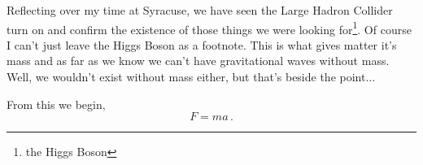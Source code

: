 Reflecting over my time at Syracuse, we have seen the Large Hadron Collider
turn on and confirm the existence of those things we were looking
for\footnote{the Higgs Boson}.
Of course I can't just leave the Higgs Boson as a footnote.
This is what gives matter it's mass and as far as we know we can't have
gravitational waves without mass.
Well, we wouldn't exist without mass either, but that's beside the point...





From this we begin,
\begin{equation}
F = ma\,.
\end{equation}
